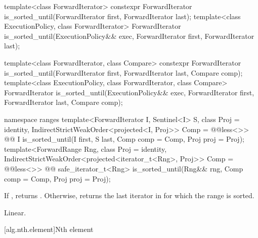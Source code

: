 %
\begin{itemdecl}
template<class ForwardIterator>
  constexpr ForwardIterator
    is_sorted_until(ForwardIterator first, ForwardIterator last);
template<class ExecutionPolicy, class ForwardIterator>
  ForwardIterator
    is_sorted_until(ExecutionPolicy&& exec,
                    ForwardIterator first, ForwardIterator last);

template<class ForwardIterator, class Compare>
  constexpr ForwardIterator
    is_sorted_until(ForwardIterator first, ForwardIterator last,
                    Compare comp);
template<class ExecutionPolicy, class ForwardIterator, class Compare>
  ForwardIterator
    is_sorted_until(ExecutionPolicy&& exec,
                    ForwardIterator first, ForwardIterator last,
                    Compare comp);
\end{itemdecl}
\begin{addedblock}
\begin{itemdecl}
namespace ranges {
  template<ForwardIterator I, Sentinel<I> S, class Proj = identity,
      IndirectStrictWeakOrder<projected<I, Proj>> Comp = @@less<>>
    @@ I is_sorted_until(I first, S last, Comp comp = Comp{}, Proj proj = Proj{});
  template<ForwardRange Rng, class Proj = identity,
      IndirectStrictWeakOrder<projected<iterator_t<Rng>, Proj>> Comp = @@less<>>
    @@ safe_iterator_t<Rng>
      is_sorted_until(Rng&& rng, Comp comp = Comp{}, Proj proj = Proj{});
}
\end{itemdecl}
\end{addedblock}

\begin{itemdescr}
\pnum
\returns If , returns
. Otherwise, returns
the last iterator  in  for which the
range  is sorted.

\pnum
\complexity Linear.
\end{itemdescr}


[alg.nth.element]{Nth element}

